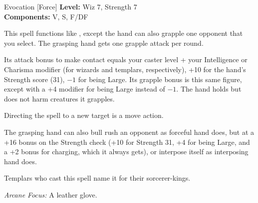 {Evocation [Force]}
{
	\textbf{Level:}
	Wiz 7, Strength 7\\
	\textbf{Components:}
	V, S, F/DF\\
}
{
	This spell functions like , except the hand can also grapple one opponent that you select. The grasping hand gets one grapple attack per round.

	Its attack bonus to make contact equals your caster level + your Intelligence or Charisma modifier (for wizards and templars, respectively), +10 for the hand's Strength score (31), $-1$ for being Large. Its grapple bonus is this same figure, except with a +4 modifier for being Large instead of $-1$. The hand holds but does not harm creatures it grapples.

	Directing the spell to a new target is a move action.

	The grasping hand can also bull rush an opponent as forceful hand does, but at a +16 bonus on the Strength check (+10 for Strength 31, +4 for being Large, and a +2 bonus for charging, which it always gets), or interpose itself as interposing hand does.

	Templars who cast this spell name it for their sorcerer-kings.

	\textit{Arcane Focus:}
	A leather glove.

}
